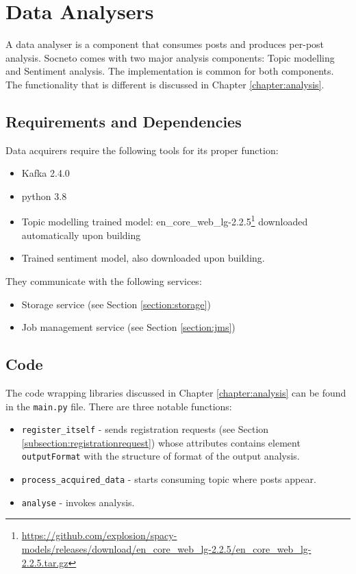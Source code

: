 \section{Data Analysers}\label{section:analysers}

A data analyser is a component that consumes posts and produces per-post analysis. Socneto comes with two major analysis components: Topic modelling and Sentiment analysis. The implementation is common for both components. The functionality that is different is discussed in  Chapter \ref{chapter:analysis}.

\subsection{Requirements and Dependencies}

Data acquirers require the following tools for its proper function:

\begin{itemize}
    \item Kafka 2.4.0
    \item python 3.8
    \item Topic modelling trained model: en\_core\_web\_lg-2.2.5\footnote{\url{https://github.com/explosion/spacy-models/releases/download/en_core_web_lg-2.2.5/en_core_web_lg-2.2.5.tar.gz}} downloaded automatically upon building
    \item Trained sentiment model, also downloaded upon building.
\end{itemize}

They communicate with the following services:
\begin{itemize}
    \item Storage service (see Section \ref{section:storage})
    \item Job management service (see Section \ref{section:jms})
\end{itemize}

\subsection{Code}

The code wrapping libraries discussed in Chapter \ref{chapter:analysis} can be found in the \texttt{main.py} file. There are three notable functions:

\begin{itemize}
    \item \texttt{register\_itself} - sends registration requests (see Section \ref{subsection:registrationrequest}) whose attributes contains element \texttt{outputFormat} with the structure of format of the output analysis.
    \item \texttt{process\_acquired\_data} -  starts consuming topic where posts appear.
    \item \texttt{analyse} - invokes analysis.
\end{itemize}

